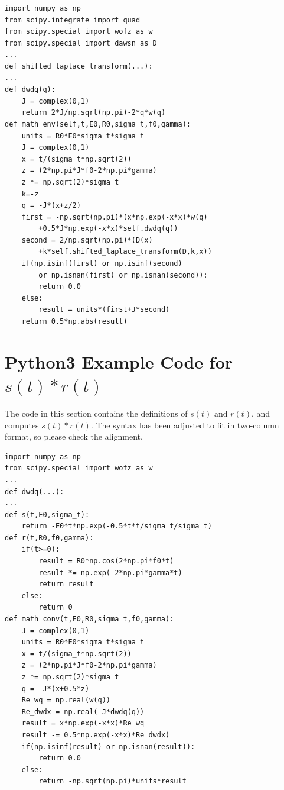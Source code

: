 \documentclass[amsmath,amssymb,aps,prd,10pt,twocolumn,showkeys]{revtex4}
\begin{document}
\small
\begin{verbatim}
import numpy as np
from scipy.integrate import quad
from scipy.special import wofz as w
from scipy.special import dawsn as D
...
def shifted_laplace_transform(...):
...
def dwdq(q):
    J = complex(0,1)
    return 2*J/np.sqrt(np.pi)-2*q*w(q)
def math_env(self,t,E0,R0,sigma_t,f0,gamma):
    units = R0*E0*sigma_t*sigma_t
    J = complex(0,1)
    x = t/(sigma_t*np.sqrt(2))
    z = (2*np.pi*J*f0-2*np.pi*gamma)
    z *= np.sqrt(2)*sigma_t
    k=-z
    q = -J*(x+z/2)
    first = -np.sqrt(np.pi)*(x*np.exp(-x*x)*w(q)
        +0.5*J*np.exp(-x*x)*self.dwdq(q))
    second = 2/np.sqrt(np.pi)*(D(x)
        +k*self.shifted_laplace_transform(D,k,x))
    if(np.isinf(first) or np.isinf(second) 
        or np.isnan(first) or np.isnan(second)):
        return 0.0
    else:
        result = units*(first+J*second)
    return 0.5*np.abs(result)
\end{verbatim}

\section{Python3 Example Code for $s(t) * r(t)$}
\label{sec:appC}

The code in this section contains the definitions of $s(t)$ and $r(t)$, and computes $s(t) * r(t)$.  The syntax has been adjusted to fit in two-column format, so please check the alignment.

\small
\begin{verbatim}
import numpy as np
from scipy.special import wofz as w
...
def dwdq(...):
...
def s(t,E0,sigma_t):
    return -E0*t*np.exp(-0.5*t*t/sigma_t/sigma_t)
def r(t,R0,f0,gamma):
    if(t>=0):
        result = R0*np.cos(2*np.pi*f0*t)
        result *= np.exp(-2*np.pi*gamma*t)
        return result
    else:
        return 0
def math_conv(t,E0,R0,sigma_t,f0,gamma):
    J = complex(0,1)
    units = R0*E0*sigma_t*sigma_t
    x = t/(sigma_t*np.sqrt(2))
    z = (2*np.pi*J*f0-2*np.pi*gamma)
    z *= np.sqrt(2)*sigma_t
    q = -J*(x+0.5*z)
    Re_wq = np.real(w(q))
    Re_dwdx = np.real(-J*dwdq(q))
    result = x*np.exp(-x*x)*Re_wq
    result -= 0.5*np.exp(-x*x)*Re_dwdx)
    if(np.isinf(result) or np.isnan(result)):
        return 0.0
    else:
        return -np.sqrt(np.pi)*units*result
\end{verbatim}


\end{document}
